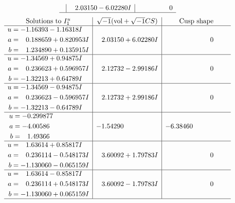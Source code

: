 \documentclass[1p]{elsarticle_modified}
\theoremstyle{definition}
\newcommand{\I}{\sqrt{-1}}
\begin{document}
$$\begin{array}{c|c|c}
 & \phantom{-}2.03150 - 6.02280 I & \phantom{-0.000000 } 0\\
 \hline 
 \end{array}$$\newpage$$\begin{array}{c|c|c}  
\text{Solutions to }I^u_{1}& \I (\text{vol} + \sqrt{-1}CS) & \text{Cusp shape}\\
 \hline 
\begin{aligned}
u &= -1.16393 - 1.16318 I \\
a &= \phantom{-}0.188659 + 0.820953 I \\
b &= \phantom{-}1.234890 + 0.135915 I\end{aligned}
 & \phantom{-}2.03150 + 6.02280 I & \phantom{-0.000000 } 0 \\ \hline\begin{aligned}
u &= -1.34569 + 0.94875 I \\
a &= \phantom{-}0.236623 + 0.596957 I \\
b &= -1.32213 + 0.64789 I\end{aligned}
 & \phantom{-}2.12732 - 2.99186 I & \phantom{-0.000000 } 0 \\ \hline\begin{aligned}
u &= -1.34569 - 0.94875 I \\
a &= \phantom{-}0.236623 - 0.596957 I \\
b &= -1.32213 - 0.64789 I\end{aligned}
 & \phantom{-}2.12732 + 2.99186 I & \phantom{-0.000000 } 0 \\ \hline\begin{aligned}
u &= -0.299877\phantom{ +0.000000I} \\
a &= -4.00586\phantom{ +0.000000I} \\
b &= \phantom{-}1.49366\phantom{ +0.000000I}\end{aligned}
 & -1.54290\phantom{ +0.000000I} & -6.38460\phantom{ +0.000000I} \\ \hline\begin{aligned}
u &= \phantom{-}1.63614 + 0.85817 I \\
a &= \phantom{-}0.236114 - 0.548173 I \\
b &= -1.130060 - 0.065159 I\end{aligned}
 & \phantom{-}3.60092 + 1.79783 I & \phantom{-0.000000 } 0 \\ \hline\begin{aligned}
u &= \phantom{-}1.63614 - 0.85817 I \\
a &= \phantom{-}0.236114 + 0.548173 I \\
b &= -1.130060 + 0.065159 I\end{aligned}
 & \phantom{-}3.60092 - 1.79783 I & \phantom{-0.000000 } 0\\
 \hline 
 \end{array}$$\newpage\newpage\renewcommand{\arraystretch}{1}
\end{document}

